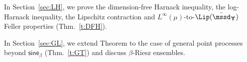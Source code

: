 \documentclass[11pt,letterpaper]{amsart}
\newcommand{\QP}{{\mu}}
\newcommand{\dUpsilon}{{\mathbf \Upsilon}}
\newcommand{\U}{\dUpsilon}
\newcommand{\sine}{\mathsf{sine}}
\renewcommand{\1}{\mathbf 1}
\numberwithin{equation}{section}
\theoremstyle{plain}
\theoremstyle{definition}
\theoremstyle{remark}
\begin{document}
In Section~\ref{sec:LH}, we prove the dimension-free Harnack inequality, the log-Harnack inequality, the Lipschitz contraction and $L^\infty(\QP)$-to-$\Lip(\bar{\mssd}_\U)$ Feller properties (Thm.~\ref{t:DFH}). 

In Section~\ref{sec:GL}, we extend Theorem to the case of general point processes beyond $\sine_\beta$ (Thm.~\ref{t:GT}) and discuss $\beta$-Riesz ensembles.  
\end{document}
